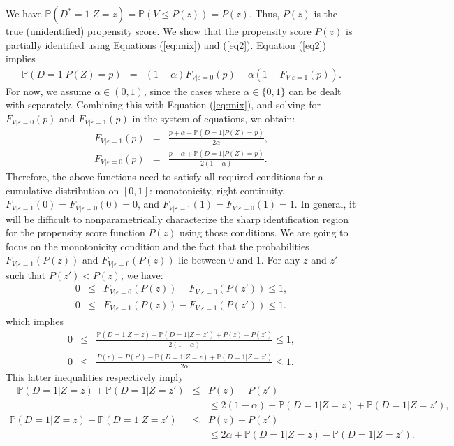 \documentclass[11pt,reqno]{amsart}
\theoremstyle{plain}
\numberwithin{equation}{section}
\begin{document}
We have $\mathbb P(D^*=1\vert Z=z)=\mathbb P(V \leq P(z))=P(z)$. Thus, $P(z)$ is the true (unidentified) propensity score.
We show that the propensity score $P(z)$ is partially identified using Equations (\ref{eq:mix}) and (\ref{eq2}). Equation (\ref{eq2}) implies
\begin{eqnarray*}
\mathbb P(D=1 \vert P(Z)=p)&=& (1-\alpha) F_{V\vert \varepsilon=0}(p) + \alpha (1-F_{V\vert \varepsilon=1}(p)).
\end{eqnarray*}
For now, we assume $\alpha \in (0,1)$, since the cases where $\alpha\in \{0,1\}$ can be dealt with separately. %
Combining this with Equation (\ref{eq:mix}), and solving for $F_{V\vert \varepsilon=0}(p)$ and $F_{V\vert \varepsilon=1}(p)$ in the system of equations, we obtain:
\begin{eqnarray*}
F_{V\vert \varepsilon=1}(p)&=& \frac{p+\alpha-\mathbb P(D=1\vert P(Z)=p)}{2 \alpha},\\
F_{V\vert \varepsilon=0}(p)&=& \frac{p-\alpha+\mathbb P(D=1\vert P(Z)=p)}{2(1-\alpha)}.
\end{eqnarray*}
Therefore, the above functions need to satisfy all required conditions for a cumulative distribution on $[0,1]$: monotonicity, right-continuity, $F_{V\vert \varepsilon=1}(0)=F_{V\vert \varepsilon=0}(0)=0$, and $F_{V\vert \varepsilon=1}(1)=F_{V\vert \varepsilon=0}(1)=1$. In general, it will be difficult to nonparametrically characterize the sharp identification region for the propensity score function $P(z)$ using those conditions. We are going to focus on the monotonicity condition and the fact that the probabilities $F_{V\vert \varepsilon=1}(P(z))$ and $F_{V\vert \varepsilon=0}(P(z))$ lie between 0 and 1. For any $z$ and $z'$ such that $P(z') <P(z)$, we have:
\begin{eqnarray*}
0 &\leq& F_{V\vert \varepsilon=0}(P(z))- F_{V\vert \varepsilon=0}(P(z')) \leq 1,\\
0 &\leq& F_{V\vert \varepsilon=1}(P(z))- F_{V\vert \varepsilon=1}(P(z')) \leq 1.
\end{eqnarray*}
which implies
\begin{eqnarray*}
0 &\leq& \frac{\mathbb P(D=1 \vert Z=z)-\mathbb P(D=1 \vert Z=z')+P(z)-P(z')}{2(1-\alpha)} \leq 1,\\
0 &\leq& \frac{P(z)-P(z')-\mathbb P(D=1 \vert Z=z)+\mathbb P(D=1 \vert Z=z')}{2\alpha} \leq 1.
\end{eqnarray*}
This latter inequalities respectively imply
\begin{eqnarray}
-\mathbb P(D=1 \vert Z=z)+\mathbb P(D=1 \vert Z=z') &\leq& P(z)-P(z') \label{eq:mtecont1}\\
&& \leq 2(1-\alpha)-\mathbb P(D=1 \vert Z=z)+\mathbb P(D=1 \vert Z=z'),\nonumber\\
\mathbb P(D=1 \vert Z=z)-\mathbb P(D=1 \vert Z=z') &\leq& P(z)-P(z') \label{eq:mtecont2}\\
&& \leq 2 \alpha + \mathbb P(D=1 \vert Z=z)-\mathbb P(D=1 \vert Z=z'). \nonumber
\end{eqnarray}
\end{document}
